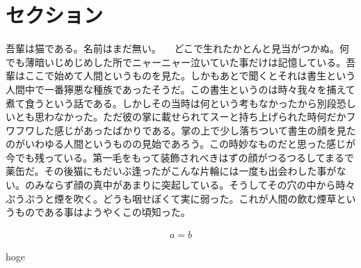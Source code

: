 \section{セクション}

吾輩は猫である。名前はまだ無い。
　どこで生れたかとんと見当がつかぬ。何でも薄暗いじめじめした所でニャーニャー泣いていた事だけは記憶している。吾輩はここで始めて人間というものを見た。しかもあとで聞くとそれは書生という人間中で一番獰悪な種族であったそうだ。この書生というのは時々我々を捕えて煮て食うという話である。しかしその当時は何という考もなかったから別段恐しいとも思わなかった。ただ彼の掌に載せられてスーと持ち上げられた時何だかフワフワした感じがあったばかりである。掌の上で少し落ちついて書生の顔を見たのがいわゆる人間というものの見始であろう。この時妙なものだと思った感じが今でも残っている。第一毛をもって装飾されべきはずの顔がつるつるしてまるで薬缶だ。その後猫にもだいぶ逢ったがこんな片輪には一度も出会わした事がない。のみならず顔の真中があまりに突起している。そうしてその穴の中から時々ぷうぷうと煙を吹く。どうも咽せぽくて実に弱った。これが人間の飲む煙草というものである事はようやくこの頃知った。

\begin{align}
    a=b \label{foo}
\end{align}

hoge


\cite{_article, _book, _misc, _incollection, _inproceedings, _techreport}
